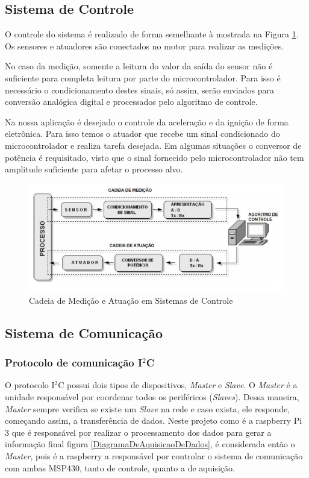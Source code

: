 \subsection{Sistema de Controle}

O controle do sistema é realizado de forma semelhante à mostrada na Figura \ref{CadeiaDeMedicao}. Os sensores e atuadores são conectados no motor para realizar as medições. 

No caso da medição, somente a leitura do valor da saída do sensor não é suficiente para completa leitura por parte do microcontrolador. Para isso é necessário o condicionamento destes sinais, só assim, serão enviados para conversão analógica digital e processados pelo algoritmo de controle.

Na nossa aplicação é desejado o controle da aceleração e da ignição de forma eletrônica. Para isso temos o atuador que recebe um sinal condicionado do microcontrolador e realiza tarefa desejada. Em algumas situações o conversor de potência é requisitado, visto que o sinal fornecido pelo microcontrolador não tem amplitude suficiente para afetar o processo alvo.

\begin{figure}[h!]
	\centering
	\includegraphics[keepaspectratio=true,scale= 0.9]{figuras/CadeiaDeMedicao.PNG}
	\caption{Cadeia de Medição e Atuação em Sistemas de Controle \cite{SMAR}}
	\label{CadeiaDeMedicao}
\end{figure}

\subsection{Sistema de Comunicação}

\subsubsection{Protocolo de comunicação I$^{2}$C}

O protocolo I$^{2}$C possui dois tipos de dispositivos, \textit{Master} e \textit{Slave}. O \textit{Master} é a unidade responsável por coordenar todos os periféricos (\textit{Slaves}). Dessa maneira, \textit{Master} sempre verifica se existe um \textit{Slave} na rede e caso exista, ele responde, começando assim, a transferência de dados.
Neste projeto como é a raspberry Pi 3 que é responsável por realizar o processamento dos dados para gerar a informação final figura \ref{DiagramaDeAquisicaoDeDados}, é considerada então o \textit{Master}, pois é a raspberry a responsável por controlar o sistema de comunicação com ambas MSP430, tanto de controle, quanto a de aquisição.


